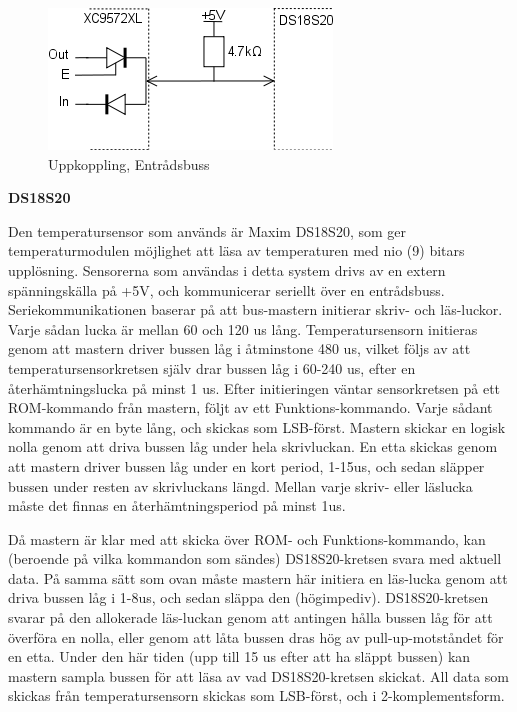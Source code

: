 \documentclass[a4paper,11pt]{article}
\begin{document}
	\begin{figure}[h!tb]
	  \centering
	      \includegraphics[scale=1, angle=0]{TempBus.png}
	  	\caption{Uppkoppling, Entrådsbuss}
	\end{figure}

{\noindent \bf DS18S20}

Den temperatursensor som används är Maxim DS18S20, som ger temperaturmodulen möjlighet att läsa av temperaturen
med nio (9) bitars upplösning. Sensorerna som användas i detta system drivs av en extern spänningskälla på +5V,
och kommunicerar seriellt över en entrådsbuss. Seriekommunikationen baserar på att bus-mastern initierar skriv-
och läs-luckor. Varje sådan lucka är mellan 60 och 120 us lång. Temperatursensorn initieras genom att mastern
driver bussen låg i åtminstone 480 us, vilket följs av att temperatursensorkretsen själv drar bussen låg i 60-240 us,
efter en återhämtningslucka på minst 1 us. Efter initieringen väntar sensorkretsen på ett ROM-kommando från mastern,
följt av ett Funktions-kommando. Varje sådant kommando är en byte lång, och skickas som LSB-först. Mastern skickar
en logisk nolla genom att driva bussen låg under hela skrivluckan. En etta skickas genom att mastern driver bussen låg
under en kort period, 1-15us, och sedan släpper bussen under resten av skrivluckans längd. Mellan varje skriv- eller läslucka
måste det finnas en återhämtningsperiod på minst 1us.

Då mastern är klar med att skicka över ROM- och Funktions-kommando, kan (beroende på vilka kommandon som sändes) DS18S20-kretsen
svara med aktuell data. På samma sätt som ovan måste mastern här initiera en läs-lucka genom att driva bussen låg i 1-8us, och
sedan släppa den (högimpediv). DS18S20-kretsen svarar på den allokerade läs-luckan genom att antingen hålla bussen låg för att
överföra en nolla, eller genom att låta bussen dras hög av pull-up-motståndet för en etta. Under den här tiden (upp till 15 us
efter att ha släppt bussen) kan mastern sampla bussen för att läsa av vad DS18S20-kretsen skickat. All data som skickas från
temperatursensorn skickas som LSB-först, och i 2-komplementsform.\\
\end{document}
